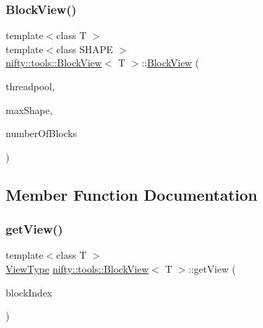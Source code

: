 \mbox{\label{classnifty_1_1tools_1_1BlockView_abb51114af3076842c35284562c13ca72}} 
\subsubsection{\texorpdfstring{Block\+View()}{BlockView()}\hspace{0.1cm}{\footnotesize\ttfamily [2/2]}}
{\footnotesize\ttfamily template$<$class T $>$ \\
template$<$class S\+H\+A\+PE $>$ \\
\hyperlink{classnifty_1_1tools_1_1BlockView}{nifty\+::tools\+::\+Block\+View}$<$ T $>$\+::\hyperlink{classnifty_1_1tools_1_1BlockView}{Block\+View} (\begin{DoxyParamCaption}\item[{\hyperlink{classnifty_1_1parallel_1_1ThreadPool}{nifty\+::parallel\+::\+Thread\+Pool} \&}]{threadpool,  }\item[{const S\+H\+A\+PE \&}]{max\+Shape,  }\item[{const std\+::size\+\_\+t}]{number\+Of\+Blocks }\end{DoxyParamCaption})\hspace{0.3cm}{\ttfamily [inline]}}



\subsection{Member Function Documentation}
\mbox{\label{classnifty_1_1tools_1_1BlockView_abbd30baab53cb89ded00f37214b6056d}} 
\subsubsection{\texorpdfstring{get\+View()}{getView()}\hspace{0.1cm}{\footnotesize\ttfamily [1/2]}}
{\footnotesize\ttfamily template$<$class T $>$ \\
\hyperlink{classnifty_1_1tools_1_1BlockView_acaadee9e8a7dc696acf1ebad24bd431d}{View\+Type} \hyperlink{classnifty_1_1tools_1_1BlockView}{nifty\+::tools\+::\+Block\+View}$<$ T $>$\+::get\+View (\begin{DoxyParamCaption}\item[{const std\+::size\+\_\+t}]{block\+Index }\end{DoxyParamCaption})\hspace{0.3cm}{\ttfamily [inline]}}

